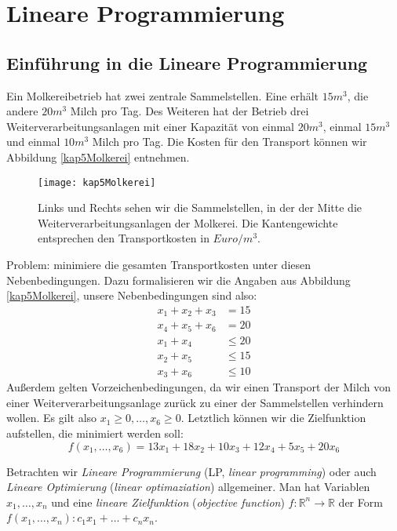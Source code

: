 \chapter{Lineare Programmierung}\label{chap:LP}
\section{Einführung in die Lineare Programmierung}
\begin{Bsp}
  \hspace{\parindent}Ein Molkereibetrieb hat zwei zentrale Sammelstellen. Eine erhält $15 m^3$, die andere $20 m^3$ Milch pro Tag. Des Weiteren hat der Betrieb drei Weiterverarbeitungsanlagen mit einer Kapazität von einmal $20 m^3$, einmal $15 m^3$ und einmal $10 m^3$ Milch pro Tag. Die Kosten für den Transport können wir Abbildung \vref{kap5Molkerei} entnehmen.
  
  \begin{figure}[htb]
    \centering
    \texttt{[image: kap5Molkerei]}
    \caption{Links und Rechts sehen wir die Sammelstellen, in der der Mitte die Weiterverarbeitungsanlagen der Molkerei. Die Kantengewichte entsprechen den Transportkosten in $Euro/m^3$.}
    \label{kap5Molkerei}
  \end{figure}

  Problem: minimiere die gesamten Transportkosten unter diesen Nebenbedingungen. Dazu formalisieren wir die Angaben aus Abbildung \vref{kap5Molkerei}, unsere Nebenbedingungen sind also:
  \begin{align*}
    x_1 + x_2 + x_3 &= 15 \\
    x_4 + x_5 + x_6 &= 20 \\
    x_1 + x_4 &\le 20 \\
    x_2 + x_5 &\le 15 \\
    x_3 + x_6 &\le 10
  \end{align*}
  Außerdem gelten Vorzeichenbedingungen, da wir einen Transport der Milch von einer Weiterverarbeitungsanlage zurück zu einer der Sammelstellen verhindern wollen. Es gilt also $x_1 \ge 0, \ldots, x_6 \ge 0$. Letztlich können wir die Zielfunktion aufstellen, die minimiert werden soll:
  \[ f(x_1, \ldots, x_6) = 13 x_1 + 18 x_2 +10 x_3 + 12 x_4 + 5 x_5 + 20 x_6 \]
\end{Bsp}

Betrachten wir \textit{Lineare Programmierung} (LP, \textit{linear programming}) oder auch \textit{Lineare Optimierung} (\textit{linear optimaziation}) allgemeiner. Man hat Variablen $x_1, \ldots, x_n$ und eine \textit{lineare Zielfunktion} (\textit{objective function}) $f : \mathbb{R}^n \to \mathbb{R}$ der Form $f(x_1, \ldots, x_n) : c_1 x_1 + \ldots + c_n x_n$.

